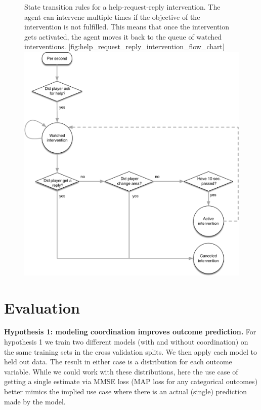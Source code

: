 %
\begin{figure}
    \begin{sidecaption}{%
        State transition rules for a help-request-reply intervention.
        The agent can intervene multiple times if the objective of the
        intervention is not fulfilled. This means that once the intervention
        gets activated, the agent moves it back to the queue of watched
        interventions.
    }[fig:help_request_reply_intervention_flow_chart]
    \includegraphics[width=\textwidth]{images/help_request_reply_intervention_flow_chart.pdf}
    \end{sidecaption}
\end{figure}
%

\section{Evaluation}

\textbf{Hypothesis 1: modeling coordination improves outcome prediction.}  For
hypothesis 1 we train two different models (with and without coordination) on
the same training sets in the cross validation splits. We then apply each model
to held out data. The result in either case is a distribution for each outcome
variable. While we could work with these distributions, here the use case of
getting a single estimate via MMSE loss (MAP loss for any categorical outcomes)
better mimics the implied use case where there is an actual (single) prediction
made by the model.


